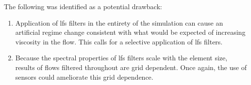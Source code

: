 The following was identified as a potential drawback:
\begin{enumerate}
\item Application of \gls{lfs} filters in the entirety of the simulation can cause an artificial regime change consistent with what would be expected of increasing viscosity in the flow. This calls for a selective application of \gls{lfs} filters.
\item Because the spectral properties of \gls{lfs} filters scale with the element size, results of flows filtered throughout are grid dependent. Once again, the use of sensors could ameliorate this grid dependence.
\end{enumerate}
